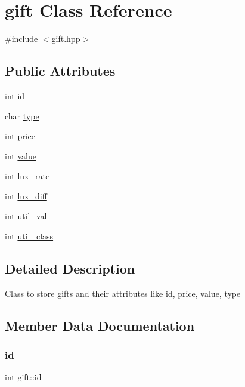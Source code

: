\hypertarget{classgift}{}\section{gift Class Reference}
\label{classgift}


{\ttfamily \#include $<$gift.\+hpp$>$}

\subsection*{Public Attributes}
\begin{DoxyCompactItemize}
\item 
int \hyperlink{classgift_a448ca0db0e3f1a39c489630369d2bde3}{id}
\item 
char \hyperlink{classgift_aaa535c180c93525e0b0452c660ac886d}{type}
\item 
int \hyperlink{classgift_a0b47f2fdc5eb88daa269cc827324c931}{price}
\item 
int \hyperlink{classgift_aa9e6fcf5bc68d7f151e7a853a25dcbeb}{value}
\item 
int \hyperlink{classgift_a8fa920d81b0de62e1ac86e06448a9e59}{lux\+\_\+rate}
\item 
int \hyperlink{classgift_a9fc91faf6d0032fd7a68419b982628e4}{lux\+\_\+diff}
\item 
int \hyperlink{classgift_a2fe42df4de2504a0bc88376682a1330c}{util\+\_\+val}
\item 
int \hyperlink{classgift_ae35e64b6107776d8affabb9c041cab61}{util\+\_\+class}
\end{DoxyCompactItemize}


\subsection{Detailed Description}
Class to store gifts and their attributes like id, price, value, type 

\subsection{Member Data Documentation}
\mbox{\label{classgift_a448ca0db0e3f1a39c489630369d2bde3}} 
\subsubsection{\texorpdfstring{id}{id}}
{\footnotesize\ttfamily int gift\+::id}

